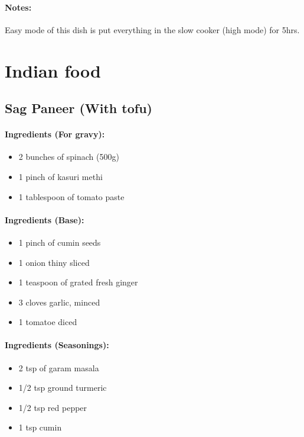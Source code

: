 \documentclass{article}
\begin{document}
\paragraph{Notes:}
Easy mode of this dish is put everything in the slow cooker (high mode) for 5hrs.

\section{Indian food}

\subsection{Sag Paneer (With tofu)}

\paragraph{Ingredients (For gravy):}
\begin{itemize}
\item 2 bunches of spinach (500g)
\item 1 pinch of kasuri methi
\item 1 tablespoon of tomato paste
\end{itemize}

\paragraph{Ingredients (Base):}
\begin{itemize}
\item 1 pinch of cumin seeds
\item 1 onion thiny sliced
\item 1 teaspoon of grated fresh ginger
\item 3 cloves garlic, minced
\item 1 tomatoe diced
\end{itemize}

\paragraph{Ingredients (Seasonings):}
\begin{itemize}
\item 2 tsp of garam masala
\item 1/2 tsp ground turmeric
\item 1/2 tsp red pepper
\item 1 tsp cumin
\end{itemize}
\end{document}
